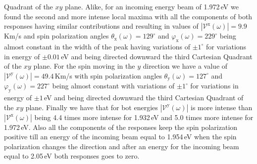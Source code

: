 \documentclass[prb,11pt,tightenlines,twocolumn,aps]{revtex4-1}
\begin{document}
Quadrant of the $xy$ plane.
% 
Alike, for an incoming energy beam of 1.972\,eV we found the second and more
intense local maxima with all the components of both responses having similar
contributions and resulting in values of
$|\mathcal{V}^{\mathrm{x}}(\omega)|=9.9$\,Km/s and spin polarization angles
$\theta_{\mathrm{x}}(\omega)=129^{\circ}$ and
$\varphi_{\mathrm{x}}(\omega)=229^{\circ}$ being almost constant in the width of
the peak having variations of $\pm1^{\circ}$ for variations in energy of
$\pm0.01$\,eV and being directed downward the third Cartesian Quadrant of the
$xy$ plane.
% 
For the spin moving in the $y$ direction we have a value of
$|\mathcal{V}^{\mathrm{y}}(\omega)|=49.4$\,Km/s with spin polarization angles
$\theta_{\mathrm{y}}(\omega)=127^{\circ}$ and
$\varphi_{\mathrm{y}}(\omega)=227^{\circ}$ being almost constant with variations
of $\pm1^{\circ}$ for variations in energy of $\pm1$\,eV and being directed
downward the third Cartesian Quadrant of the $xy$ plane.
% 
Finally we have that for bot energies $|\mathcal{V}^{\mathrm{y}}(\omega)|$ is
more intense than $|\mathcal{V}^{\mathrm{x}}(\omega)|$ being 4.4 times more
intense for 1.932\,eV and 5.0 times more intense for 1.972\,eV. Also all the
components of the responses keep the spin polarization positive till an energy
of the incoming beam equal to 1.954\,eV when the spin polarization changes the
direction and after an energy for the incoming beam equal to 2.05\,eV both
responses goes to zero.

\end{document}

